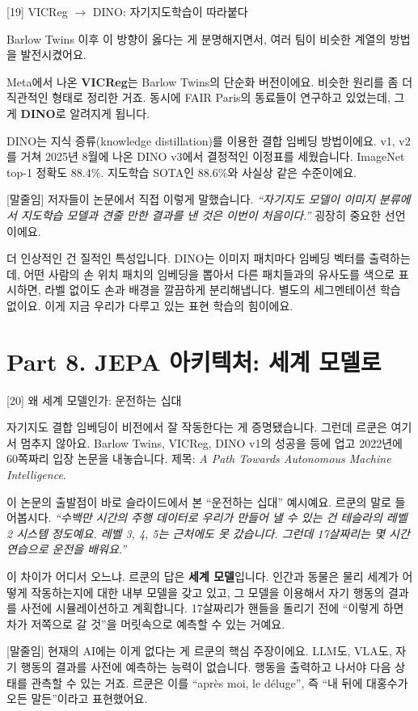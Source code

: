 \documentclass[aspectratio=169,10pt]{beamer}
\newenvironment{script}{%
  \footnotesize
  \setlength{\parskip}{0.5em}
  \setlength{\parindent}{0pt}
}{}
\begin{document}
\begin{frame}{[19] VICReg $\to$ DINO: 자기지도학습이 따라붙다}
\begin{script}
Barlow Twins 이후 이 방향이 옳다는 게 분명해지면서, 여러 팀이 비슷한 계열의 방법을 발전시켰어요.

Meta에서 나온 \textbf{VICReg}는 Barlow Twins의 단순화 버전이에요. 비슷한 원리를 좀 더 직관적인 형태로 정리한 거죠. 동시에 FAIR Paris의 동료들이 연구하고 있었는데, 그게 \textbf{DINO}로 알려지게 됩니다.

DINO는 지식 증류(knowledge distillation)를 이용한 결합 임베딩 방법이에요. v1, v2를 거쳐 2025년 8월에 나온 DINO v3에서 결정적인 이정표를 세웠습니다. ImageNet top-1 정확도 \alert{88.4\%}. 지도학습 SOTA인 88.6\%와 사실상 같은 수준이에요.

[말줄임] 저자들이 논문에서 직접 이렇게 말했습니다. \textit{``자기지도 모델이 이미지 분류에서 지도학습 모델과 견줄 만한 결과를 낸 것은 이번이 처음이다.''} 굉장히 중요한 선언이에요.

더 인상적인 건 질적인 특성입니다. DINO는 이미지 패치마다 임베딩 벡터를 출력하는데, 어떤 사람의 손 위치 패치의 임베딩을 뽑아서 다른 패치들과의 유사도를 색으로 표시하면, 라벨 없이도 손과 배경을 깔끔하게 분리해냅니다. 별도의 세그멘테이션 학습 없이요. 이게 지금 우리가 다루고 있는 표현 학습의 힘이에요.
\end{script}
\end{frame}

\section{Part 8. JEPA 아키텍처: 세계 모델로}

\begin{frame}{[20] 왜 세계 모델인가: 운전하는 십대}
\begin{script}
자기지도 결합 임베딩이 비전에서 잘 작동한다는 게 증명됐습니다. 그런데 르쿤은 여기서 멈추지 않아요. Barlow Twins, VICReg, DINO v1의 성공을 등에 업고 2022년에 60쪽짜리 입장 논문을 내놓습니다. 제목: \textit{A Path Towards Autonomous Machine Intelligence}.

이 논문의 출발점이 바로 슬라이드에서 본 ``운전하는 십대'' 예시예요. 르쿤의 말로 들어봅시다. \textit{``수백만 시간의 주행 데이터로 우리가 만들어 낼 수 있는 건 테슬라의 레벨 2 시스템 정도예요. 레벨 3, 4, 5는 근처에도 못 갔습니다. 그런데 17살짜리는 몇 시간 연습으로 운전을 배워요.''}

이 차이가 어디서 오느냐. 르쿤의 답은 \textbf{세계 모델}입니다. 인간과 동물은 물리 세계가 어떻게 작동하는지에 대한 내부 모델을 갖고 있고, 그 모델을 이용해서 자기 행동의 결과를 \alert{사전에 시뮬레이션}하고 계획합니다. 17살짜리가 핸들을 돌리기 전에 ``이렇게 하면 차가 저쪽으로 갈 것''을 머릿속으로 예측할 수 있는 거예요.

[말줄임] 현재의 AI에는 이게 없다는 게 르쿤의 핵심 주장이에요. LLM도, VLA도, 자기 행동의 결과를 사전에 예측하는 능력이 없습니다. 행동을 출력하고 나서야 다음 상태를 관측할 수 있는 거죠. 르쿤은 이를 ``après moi, le déluge'', 즉 ``내 뒤에 대홍수가 오든 말든''이라고 표현했어요.
\end{script}
\end{frame}
\end{document}
